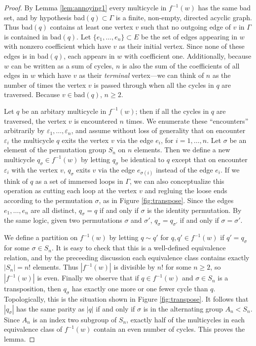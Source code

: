 \documentclass[11pt,hyp,]{nyjm}
\numberwithin{thm}{section}
\theoremstyle{definition}
\theoremstyle{remark}
\begin{document}
	\begin{proof}
		By Lemma \ref{lem:annoying1} every multicycle in $f^{-1}(w)$ has the same bad set, and by hypothesis bad$(q) \subset \Gamma$ is a finite, non-empty, directed acyclic graph. Thus bad$(q)$ contains at least one vertex $v$ such that no outgoing edge of $v$ in $\Gamma$ is contained in $\text{bad}(q)$. Let $\{e_1, \dots, e_n\} \subset E$ be the set of edges appearing in $w$ with nonzero coefficient which have $v$ as their initial vertex. Since none of these edges is in bad$(q)$, each appears in $w$ with coefficient one. Additionally, because $w$ can be written as a sum of cycles, $n$ is also the sum of the coefficients of all edges in $w$ which have $v$ as their {\em terminal} vertex---we can think of $n$ as the number of times the vertex $v$ is passed through when all the cycles in $q$ are traversed. Because $v \in \text{bad}(q)$, $n \geq 2$.
		
		Let $q$ be an arbitary multicycle in $f^{-1}(w)$; then if all the cycles in $q$ are traversed, the vertex $v$ is encountered $n$ times. We enumerate these ``encounters'' arbitrarily by $\varepsilon_1, \dots, \varepsilon_n$, and assume without loss of generality that on encounter $\varepsilon_i$ the multicycle $q$ exits the vertex $v$ via the edge $e_i$, for $i = 1, \dots, n$. Let $\sigma$ be an element of the permutation group $S_n$ on $n$ elements. Then we define a new multicycle $q_\sigma \in f^{-1}(w)$ by letting $q_\sigma$ be identical to $q$ except that on encounter $\varepsilon_i$ with the vertex $v$, $q_\sigma$ exits $v$ via the edge $e_{\sigma(i)}$ instead of the edge $e_i$. If we think of $q$ as a set of immersed loops in $\Gamma$, we can also conceptualize this operation as cutting each loop at the vertex $v$ and regluing the loose ends according to the permutation $\sigma$, as in Figure \ref{fig:transpose}. Since the edges $e_1, \dots, e_n$ are all distinct, $q_\sigma = q$ if and only if $\sigma$ is the identity permutation. By the same logic, given two permutations $\sigma$ and $\sigma'$, $q_\sigma = q_{\sigma'}$ if and only if $\sigma = \sigma'$.
		
		We define a partition on $f^{-1}(w)$ by letting $q \sim q'$ for $q, q' \in f^{-1}(w)$ if $q' = q_\sigma$ for some $\sigma \in S_n$. It is easy to check that this is a well-defined equivalence relation, and by the preceeding discussion each equivalence class contains exactly $|S_n| = n!$ elements. Thus $|f^{-1}(w)|$ is divisible by $n!$ for some $n \geq 2$, so $|f^{-1}(w)|$ is even. Finally we observe that if $q \in f^{-1}(w)$ and $\sigma \in S_n$ is a transposition, then $q_\sigma$ has exactly one more or one fewer cycle than $q$. Topologically, this is the situation shown in Figure \ref{fig:transpose}. It follows that $|q_\sigma|$ has the same parity as $|q|$ if and only if $\sigma$ is in the alternating group $A_n < S_n$. Since $A_n$ is an index two subgroup of $S_n$, exactly half of the multicycles in each equivalence class of $f^{-1}(w)$ contain an even number of cycles. This proves the lemma.
	\end{proof}
\end{document}
